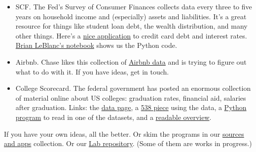 \documentclass[11pt]{article}
\begin{document}
\begin{itemize}
\begin{itemize}
\item SCF.  The Fed's Survey of Consumer Finances collects data every three to five years
on household income and (especially) assets and liabilities.
It's a great resource for things like student loan debt, the wealth distribution,
and many other things.
Here's a
\href{http://www.npr.org/sections/money/2015/08/14/431263285/13-years-of-american-credit-cards-in-one-graph}
{nice application}
to credit card debt and interest rates.
\href{https://github.com/NYUDataBootcamp/Materials/blob/master/Code/Lab/SCF_data_experiment_Brian.ipynb}
{Brian LeBlanc's notebook}
shows us the Python code.

\item Airbnb.
Chase likes this collection of \href{http://insideairbnb.com/index.html}{Airbnb data}
and is trying to figure out what to do with it.  If you have ideas, get in touch.

\item {College Scorecard.}
The federal government has posted an enormous collection of material online
about US colleges:  graduation rates, financial aid, salaries after graduation.
Links:  the \href{https://collegescorecard.ed.gov/data/}{data page},
a \href{http://fivethirtyeight.com/features/shut-up-about-harvard/}{538 piece} using the data,
a \href{https://github.com/NYUDataBootcamp/Materials/blob/master/Code/Lab/College_Scorecard_data_input.py}
{Python program} to read in one of the datasets,
and a \href{http://www.vox.com/2015/9/12/9314695/college-scorecard-earnings}{readable overview}.

\end{itemize}

If you have your own ideas, all the better.
Or skim the programs in our
\href{https://docs.google.com/document/d/1L2ZDKFyyqfOrCGbNcCIE9mmgap4tjkTNuw32hK4c6BI/edit?usp=sharing}
{sources and apps} collection.
Or our
\href{https://github.com/NYUDataBootcamp/Lab}{Lab repository}.
(Some of them are works in progress.)


\begin{comment}
\item {\bf IPython notebook of data input chapter.\/}
Create a notebook that goes through the material of the data input chapter of the book,
or perhaps one of the other early chapters.
The result should be a notebook that allows others to teach themselves.
Include blank cells for exercises.
\end{comment}
\end{itemize}



\end{document}
